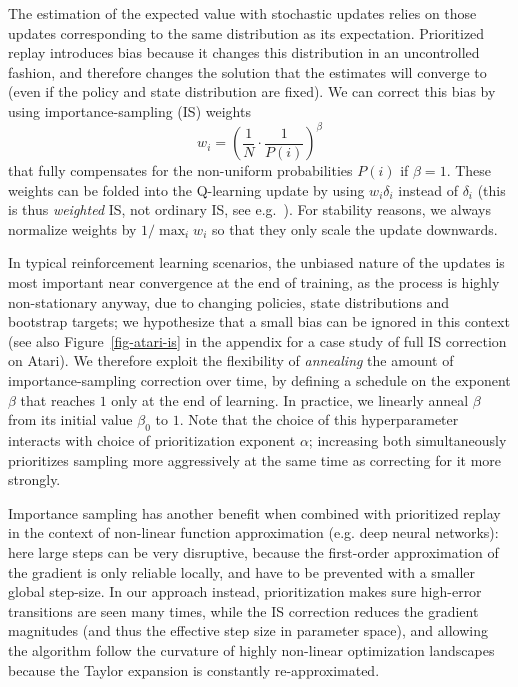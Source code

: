 \documentclass[a4paper]{article}
\begin{document}
The estimation of the expected value with stochastic updates relies on those updates corresponding
to the same distribution as its expectation. Prioritized replay introduces bias because it changes this distribution in an uncontrolled fashion, and therefore changes the solution that the 
estimates will converge to (even if the policy and state distribution are fixed). 
We can correct this bias by using importance-sampling (IS) weights
\[
w_i = \left(\frac{1}{N} \cdot \frac{1}{P(i)}\right)^{\beta}
\]
that fully compensates for the non-uniform probabilities $P(i)$ if $\beta=1$.
These weights can be folded into the Q-learning update by using $w_i\delta_i$ instead of $\delta_i$ 
(this is thus \emph{weighted} IS, not ordinary IS, see e.g.\ \citealp{wis}).
For stability reasons, we always normalize weights by $1/\max_i w_i$ so that they only scale the update downwards.

In typical reinforcement learning scenarios, the unbiased nature of the updates is most important
near convergence at the end of training, as the process is highly non-stationary anyway, 
due to changing policies, state distributions and bootstrap targets;
we hypothesize that a small bias can be ignored in this context
(see also Figure~\ref{fig-atari-is} in the appendix for a case study of full IS correction on Atari).
We therefore exploit the flexibility of \emph{annealing} the amount of importance-sampling 
correction over time, by defining a schedule on the exponent $\beta$ that 
reaches $1$ only at the end of learning.
In practice, we linearly anneal $\beta$ from its initial value $\beta_0$ to $1$.
Note that the choice of this hyperparameter 
interacts with choice of prioritization exponent $\alpha$; increasing both simultaneously prioritizes sampling more aggressively at the same time as correcting for it more strongly.

Importance sampling has another benefit when combined with prioritized replay in the context of non-linear function approximation (e.g. deep neural networks):
here large steps can be very disruptive,
because the first-order approximation of the gradient is only reliable locally,
and have to be prevented with a smaller global step-size.
In our approach instead, prioritization makes sure high-error transitions are seen many times, while the IS correction reduces the gradient magnitudes 
(and thus the effective step size in parameter space),
and allowing the algorithm follow the curvature of highly non-linear optimization landscapes because the Taylor expansion is constantly re-approximated.
\end{document}
